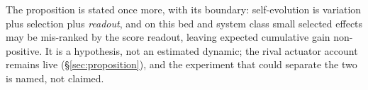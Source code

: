 The proposition is stated once more, with its boundary: self-evolution is
variation plus selection plus \emph{readout}, and on this bed and system
class small selected effects may be mis-ranked by the score readout,
leaving expected cumulative gain non-positive. It is a hypothesis, not an
estimated dynamic; the rival actuator account remains live
(\S\ref{sec:proposition}), and the experiment that could separate the two
is named, not claimed.

